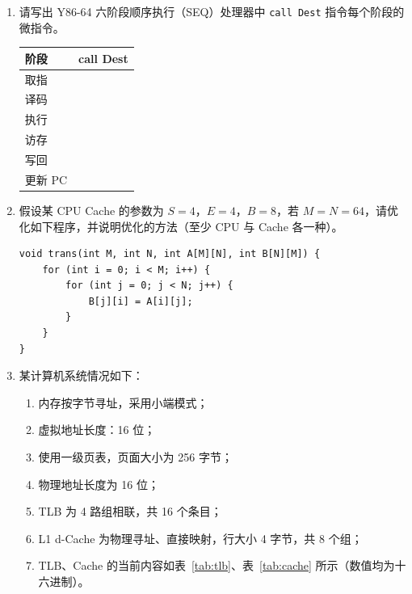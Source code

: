 \documentclass[11pt,a4paper]{ctexart}
\begin{document}
\begin{enumerate}[resume]
\item 请写出 Y86-64 六阶段顺序执行（SEQ）处理器中 \texttt{call Dest} 指令每个阶段的微指令。

\begin{center}
\renewcommand{\arraystretch}{1.6}
\begin{tabular}{|p{2.2cm}|p{11cm}|}
\hline
\textbf{阶段} & \textbf{call Dest} \\
\hline
取指 & \\
\hline
译码 & \\
\hline
执行 & \\
\hline
访存 & \\
\hline
写回 & \\
\hline
更新 PC & \\
\hline
\end{tabular}
\end{center}

\item 假设某 CPU Cache 的参数为 $S=4$，$E=4$，$B=8$，若 $M=N=64$，请优化如下程序，并说明优化的方法（至少 CPU 与 Cache 各一种）。
\begin{lstlisting}
void trans(int M, int N, int A[M][N], int B[N][M]) {
    for (int i = 0; i < M; i++) {
        for (int j = 0; j < N; j++) {
            B[j][i] = A[i][j];
        }
    }
}
\end{lstlisting}

\vspace{3em}

\item 某计算机系统情况如下：
\begin{enumerate}[label=（\arabic*）,itemsep=0.1em]
  \item 内存按字节寻址，采用小端模式；
  \item 虚拟地址长度：16 位；
  \item 使用一级页表，页面大小为 256 字节；
  \item 物理地址长度为 16 位；
  \item TLB 为 4 路组相联，共 16 个条目；
  \item L1 d-Cache 为物理寻址、直接映射，行大小 4 字节，共 8 个组；
  \item TLB、Cache 的当前内容如表~\ref{tab:tlb}、表~\ref{tab:cache} 所示（数值均为十六进制）。
\end{enumerate}


\end{enumerate}
\end{document}
